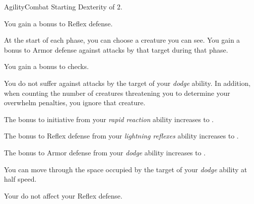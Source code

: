     \begin{feat}{Agility}{Combat}
        \featpre Starting Dexterity of 2.
        \featben

         You gain a  bonus to Reflex defense.

         At the start of each phase, you can choose a creature you can see.
        You gain a  bonus to Armor defense against attacks by that target during that phase.

         You gain a  bonus to  checks.

        \ff[6]{} 

         You do not suffer  against attacks by the target of your \textit{dodge} ability.
        In addition, when counting the number of creatures threatening you to determine your overwhelm penalties, you ignore that creature.

         The bonus to initiative from your \textit{rapid reaction} ability increases to .

         The bonus to Reflex defense from your \textit{lightning reflexes} ability increases to .

         The bonus to Armor defense from your \textit{dodge} ability increases to .

         You can move through the space occupied by the target of your \textit{dodge} ability at half speed.

         Your  do not affect your Reflex defense.
    \end{feat}

